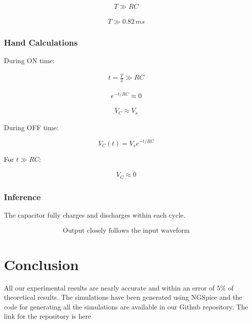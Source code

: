 \documentclass{scrreprt}
\begin{document}
\begin{align}
T \gg RC
\end{align}

\begin{align}
T \gg 0.82\,ms
\end{align}

\subsubsection{Hand Calculations}

During ON time:

\begin{align}
t = \frac{T}{2} \gg RC
\end{align}

\begin{align}
e^{-t/RC} \approx 0
\end{align}

\begin{align}
V_C \approx V_s
\end{align}

During OFF time:

\begin{equation}
V_C(t) = V_s e^{-t/RC}
\end{equation}

For $t \gg RC$:

\begin{align}
V_C \approx 0
\end{align}

\subsubsection*{Inference}

The capacitor fully charges and discharges within each cycle.

\begin{align}
\boxed{\text{Output closely follows the input waveform}}
\end{align}

\section{Conclusion}
All our experimental results are nearly accurate and within an error of $5\%$ of theoretical results. The simulations have been generated using NGSpice and the code for generating all the simulations are available in our Github repository. The link for the repository is here


\end{document}

